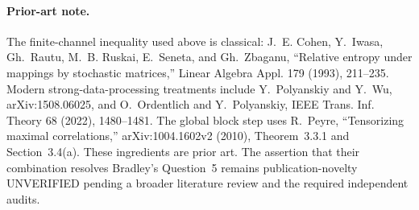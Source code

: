 \paragraph{Prior-art note.}
The finite-channel inequality used above is classical: J.~E. Cohen,
Y.~Iwasa, Gh.~Rautu, M.~B. Ruskai, E.~Seneta, and Gh.~Zbaganu,
``Relative entropy under mappings by stochastic matrices,'' Linear Algebra
Appl. 179 (1993), 211--235.  Modern strong-data-processing treatments include
Y.~Polyanskiy and Y.~Wu, arXiv:1508.06025, and O.~Ordentlich and
Y.~Polyanskiy, IEEE Trans. Inf. Theory 68 (2022), 1480--1481.  The global
block step uses R.~Peyre, ``Tensorizing maximal correlations,''
arXiv:1004.1602v2 (2010), Theorem~3.3.1 and Section~3.4(a).  These ingredients
are prior art.  The assertion that their combination resolves Bradley's
Question~5 remains publication-novelty UNVERIFIED pending a broader literature
review and the required independent audits.
